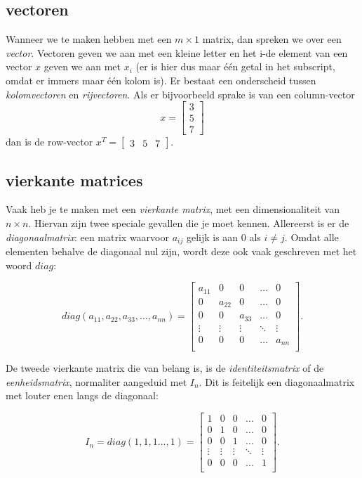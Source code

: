 \subsection{vectoren}
Wanneer we te maken hebben met een $m \times 1$ matrix, dan spreken we over een \textit{vector}. Vectoren geven we aan met een kleine letter en het i-de element van een vector $x$ geven we aan met $x_i$ (er is hier dus maar één getal in het subscript, omdat er immers maar één kolom is). Er bestaat een onderscheid tussen \textit{kolomvectoren} en \textit{rijvectoren}. Als er bijvoorbeeld sprake is van een column-vector
%
\[ 
x = \begin{bmatrix} 
3\\
5\\
7
\end{bmatrix}
\] 
%
dan is de row-vector $x^T = \begin{bmatrix}3 & 5 & 7\end{bmatrix}$.

\subsection{vierkante matrices}
Vaak heb je te maken met een \textit{vierkante matrix}, met een dimensionaliteit van $n \times n$. Hiervan zijn twee speciale gevallen die je moet kennen. Allereerst is er de \textit{diagonaalmatrix}: een matrix waarvoor $a_{ij}$ gelijk is aan $0$ als $i \neq j$. Omdat alle elementen behalve de diagonaal nul zijn, wordt deze ook vaak geschreven met het woord $diag$:

\[
diag(a_{11}, a_{22}, a_{33}, \hdots, a_{nn}) =
\begin{bmatrix}
a_{11} & 0 & 0 & \hdots & 0 \\
0 & a_{22} & 0 & \hdots & 0 \\
0 & 0 & a_{33} & \hdots & 0 \\
\vdots & \vdots &\vdots & \ddots & \vdots \\
0 & 0 & 0 & \hdots & a_{nn} \\
\end{bmatrix}.
\]

De tweede vierkante matrix die van belang is, is de \textit{identiteitsmatrix} of de \textit{eenheidsmatrix}, normaliter aangeduid met $I_n$. Dit is feitelijk een diagonaalmatrix met louter enen langs de diagonaal:

\[
I_n = diag(1, 1, 1 \hdots, 1) = 
\begin{bmatrix}
1 & 0 & 0 & \hdots & 0 \\
0 & 1 & 0 & \hdots & 0 \\
0 & 0 & 1 & \hdots & 0 \\
\vdots & \vdots &\vdots & \ddots & \vdots \\
0 & 0 & 0 & \hdots & 1 \\
\end{bmatrix}.
\]

